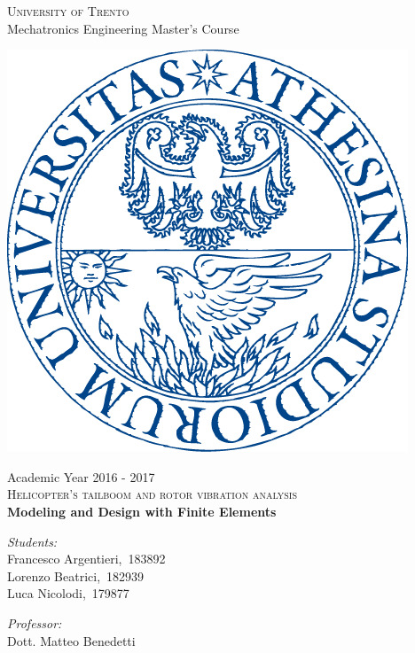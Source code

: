 \begin{center} 
	
	\huge\textsc{University of Trento}\\[0.5cm]
	{\scalebox{0.6} {Mechatronics Engineering Master's Course} \\[0.5cm]}
	
	\vspace{0.4cm}
	\begin{center}
		\centering
		\includegraphics[width=0.36\linewidth]{PICTURES/0_FRONTESPIZIO/Logo2}
	\end{center}
	\vspace{0.3cm}	   	 
	{\scalebox{0.6} {Academic Year 2016 - 2017} \\[0.8cm]}
	\huge\textsc{Helicopter's tailboom and rotor vibration analysis}\\[0.4cm]
	{  \scalebox{0.6} {\bfseries
			{Modeling and Design with Finite Elements}
		}\\[1.8cm]}
	
	\vspace{0.2cm} 
	
	\begin{minipage}[t]{0.4\textwidth}
		\begin{flushleft} \large
			\emph{Students:\\[0.1cm]}
			Francesco Argentieri, \,183892 \\
			Lorenzo Beatrici, \,182939 \\    
			Luca Nicolodi, \,179877 
			
			
			
		\end{flushleft}
	\end{minipage}
	\begin{minipage}[t]{0.5\textwidth}
		\begin{flushright} \large
			\emph{Professor:\\[0.1cm]}
			Dott. Matteo Benedetti\\   
			\vspace{0.5cm}
		\end{flushright}
	\end{minipage}
	\vfill
	
\end{center}

\newpage %
\null
\pagestyle{empty}
\newpage


